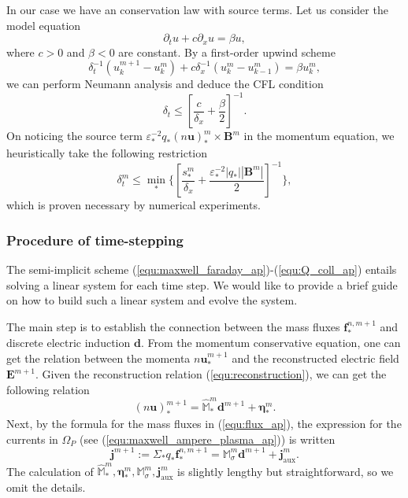 \documentclass{article}
\begin{document}
In our case we have an conservation law with source terms. Let us consider the model equation
\begin{equation*}
    \partial_tu + c\partial_xu = \beta u, 
\end{equation*}
where $c>0$ and $\beta<0$ are constant. By a first-order upwind scheme
\begin{equation*}
    \delta_t^{-1}(u^{m+1}_k - u^m_k) + c\delta_x^{-1}(u^m_k - u^m_{k-1}) = \beta u^m_k,
\end{equation*}
we can perform Neumann analysis and deduce the CFL condition
\begin{equation*}
    \delta_t \leq \left[\frac{c}{\delta_x} + \frac{\beta}{2}\right]^{-1}.
\end{equation*}
On noticing the source term $\varepsilon_*^{-2}q_*(n\mathbf{u})^m_*\times\mathbf{B}^m$ in the momentum equation, we heuristically take the following restriction
\begin{equation*}
    \delta_t^m \leq \min_*\bigg\{\left[\frac{s^m_*}{\delta_x} + \frac{\varepsilon^{-2}_*|q_*||\mathbf{B}^m|}{2}\right]^{-1}\bigg\},
\end{equation*}
which is proven necessary by numerical experiments.

\subsubsection{Procedure of time-stepping}
The semi-implicit scheme (\ref{equ:maxwell_faraday_ap})-(\ref{equ:Q_coll_ap}) entails solving a linear system for each time step. We would like to provide a brief guide on how to build such a linear system and evolve the system. 

The main step is to establish the connection between the mass fluxes $\mathbf{f}^{n,m+1}_*$ and discrete electric induction $\mathbf{d}$. From the momentum conservative equation, one can get the relation between the momenta $n\mathbf{u}^{m+1}_*$ and the reconstructed electric field $\mathbf{E}^{m+1}$. Given the reconstruction relation (\ref{equ:reconstruction}), we can get the following relation
\begin{equation*}
    (n\mathbf{u})_*^{m+1} = \hat{\mathbb{M}}^m_* \mathbf{d}^{m+1} + \bm{\eta}_*^m. 
\end{equation*}
Next, by the formula for the mass fluxes in (\ref{equ:flux_ap}), the expression for the currents in $\Omega_P$ (see (\ref{equ:maxwell_ampere_plasma_ap})) is written  
\begin{equation} \label{equ:discrete_ohm}
    \mathbf{j}^{m+1} := \Sigma_\ast q_\ast \bm{f}^{n,m+1}_\ast = \mathbb{M}_\sigma^{m} \mathbf{d}^{m+1} + \mathbf{j}^m_{\text{aux}}.
\end{equation}
The calculation of $\hat{\mathbb{M}}_*^m, \bm{\eta}_*^m, \mathbb{M}_\sigma^m, \mathbf{j}^m_{\text{aux}}$ is slightly lengthy but straightforward, so we omit the details. 
\end{document}
